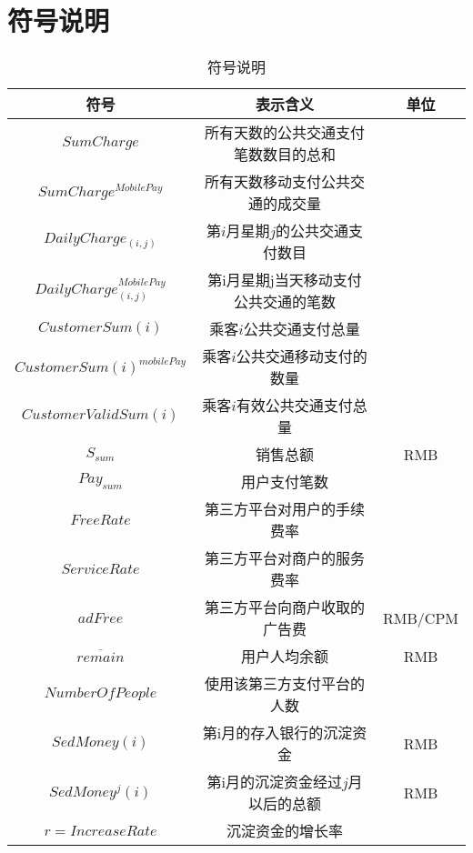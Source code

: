 \documentclass[withoutpreface,bwprint]{cumcmthesis} %
\begin{document}
\section{符号说明}
\begin{center}
\makeatletter{}\makeatother
\begin{table}[h]
\centering
\caption{符号说明}\label{tab:aStrangeTable}\centering%
\begin{tabular}{c|c|c}\hline
符号& 表示含义& 单位\\\hline
$SumCharge$ & 所有天数的公共交通支付笔数数目的总和 & \\
$SumCharge^{MobilePay}$ & 所有天数移动支付公共交通的成交量 & \\
$DailyCharge_{(i,j)}$&第$i$月星期$j$的公共交通支付数目&\\
$DailyCharge^{MobilePay}_{(i,j)}$&第i月星期j当天移动支付公共交通的笔数&\\
$CustomerSum(i)$&乘客$i$公共交通支付总量&\\
$CustomerSum(i)^{mobilePay}$&乘客$i$公共交通移动支付的数量&\\
$CustomerValidSum(i)$&乘客$i$有效公共交通支付总量&\\
$S_{sum}$&销售总额&RMB\\
$Pay_{sum}$&用户支付笔数&\\
$FreeRate$&第三方平台对用户的手续费率&\\
$ServiceRate$&第三方平台对商户的服务费率&\\
$adFree$&第三方平台向商户收取的广告费&RMB/CPM\\
$\overline {remain}$&用户人均余额&RMB\\
${NumberOfPeople}$&使用该第三方支付平台的人数&\\
$SedMoney(i)$&第i月的存入银行的沉淀资金&RMB\\
$SedMoney^j(i)$&第i月的沉淀资金经过$j$月以后的总额&RMB\\
$r=IncreaseRate$&沉淀资金的增长率&\\\hline
\end{tabular}
\end{table}
\end{center}
\end{document}
